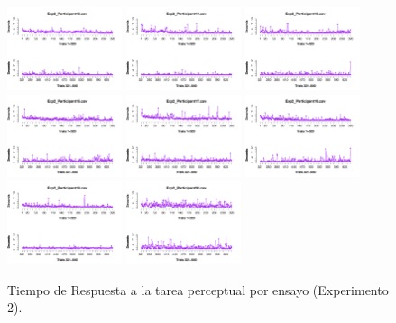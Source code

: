 \begin{figure}[th]
\includegraphics[width=0.30\textwidth]{Figures/RT1_Exp2_P13} \includegraphics[width=0.30\textwidth]{Figures/RT1_Exp2_P14} \includegraphics[width=0.30\textwidth]{Figures/RT1_Exp2_P15}
\includegraphics[width=0.30\textwidth]{Figures/RT1_Exp2_P16} \includegraphics[width=0.30\textwidth]{Figures/RT1_Exp2_P17} \includegraphics[width=0.30\textwidth]{Figures/RT1_Exp2_P18}
\includegraphics[width=0.30\textwidth]{Figures/RT1_Exp2_P19} \includegraphics[width=0.30\textwidth]{Figures/RT1_Exp2_P20} 
\caption[TR1_Exp2]{Tiempo de Respuesta a la tarea perceptual por ensayo (Experimento 2).}
\label{fig:RT1_E2}
\end{figure}

